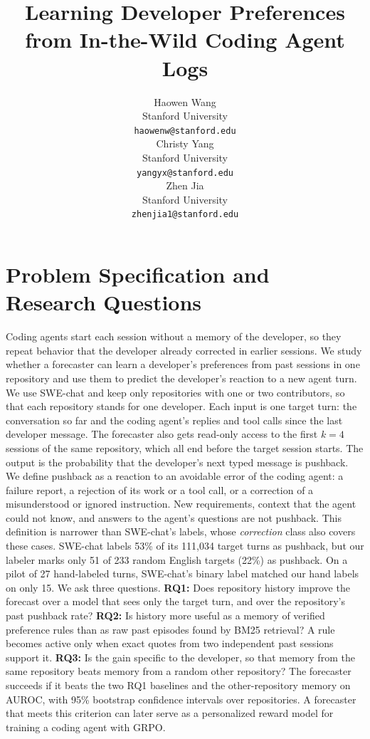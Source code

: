 \documentclass{article} %
\title{Learning Developer Preferences from In-the-Wild Coding Agent Logs}
\author{Haowen Wang \\
Stanford University \\
\texttt{haowenw@stanford.edu} \\
\And
Christy Yang \\
Stanford University \\
\texttt{yangyx@stanford.edu} \\
\And
Zhen Jia \\
Stanford University \\
\texttt{zhenjia1@stanford.edu}
}
\begin{document}
\maketitle

\section{Problem Specification and Research Questions}

Coding agents start each session without a memory of the developer, so they repeat behavior that the developer already corrected in earlier sessions.
We study whether a forecaster can learn a developer's preferences from past sessions in one repository and use them to predict the developer's reaction to a new agent turn.
We use SWE-chat \citep{baumann2026swechat} and keep only repositories with one or two contributors, so that each repository stands for one developer.
Each input is one target turn: the conversation so far and the coding agent's replies and tool calls since the last developer message.
The forecaster also gets read-only access to the first $k=4$ sessions of the same repository, which all end before the target session starts.
The output is the probability that the developer's next typed message is pushback.
We define pushback as a reaction to an avoidable error of the coding agent: a failure report, a rejection of its work or a tool call, or a correction of a misunderstood or ignored instruction.
New requirements, context that the agent could not know, and answers to the agent's questions are not pushback.
This definition is narrower than SWE-chat's labels, whose \textit{correction} class also covers these cases.
SWE-chat labels 53\% of its 111{,}034 target turns as pushback, but our labeler marks only 51 of 233 random English targets (22\%) as pushback.
On a pilot of 27 hand-labeled turns, SWE-chat's binary label matched our hand labels on only 15.
We ask three questions.
\textbf{RQ1:} Does repository history improve the forecast over a model that sees only the target turn, and over the repository's past pushback rate?
\textbf{RQ2:} Is history more useful as a memory of verified preference rules than as raw past episodes found by BM25 retrieval?
A rule becomes active only when exact quotes from two independent past sessions support it.
\textbf{RQ3:} Is the gain specific to the developer, so that memory from the same repository beats memory from a random other repository?
The forecaster succeeds if it beats the two RQ1 baselines and the other-repository memory on AUROC, with 95\% bootstrap confidence intervals over repositories.
A forecaster that meets this criterion can later serve as a personalized reward model for training a coding agent with GRPO.
\end{document}
